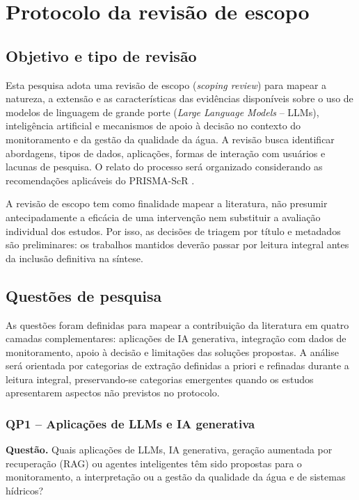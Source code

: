 \chapter{Protocolo da revisão de escopo}
\label{ap:protocolo}

\section{Objetivo e tipo de revisão}

Esta pesquisa adota uma revisão de escopo (\textit{scoping review}) para
mapear a natureza, a extensão e as características das evidências
disponíveis sobre o uso de modelos de linguagem de grande porte
(\textit{Large Language Models} -- LLMs), inteligência artificial e
mecanismos de apoio à decisão no contexto do monitoramento e da gestão
da qualidade da água. A revisão busca identificar abordagens, tipos de
dados, aplicações, formas de interação com usuários e lacunas de pesquisa.
O relato do processo será organizado considerando as recomendações
aplicáveis do PRISMA-ScR \cite{tricco2018prismascr}.

A revisão de escopo tem como finalidade mapear a literatura, não presumir
antecipadamente a eficácia de uma intervenção nem substituir a avaliação
individual dos estudos. Por isso, as decisões de triagem por título e
metadados são preliminares: os trabalhos mantidos deverão passar por
leitura integral antes da inclusão definitiva na síntese.

\section{Questões de pesquisa}

As questões foram definidas para mapear a contribuição da literatura em quatro
camadas complementares: aplicações de IA generativa, integração com dados de
monitoramento, apoio à decisão e limitações das soluções propostas. A análise
será orientada por categorias de extração definidas a priori e refinadas durante
a leitura integral, preservando-se categorias emergentes quando os estudos
apresentarem aspectos não previstos no protocolo.

\subsection{QP1 -- Aplicações de LLMs e IA generativa}

\textbf{Questão.} Quais aplicações de LLMs, IA generativa, geração aumentada
por recuperação (RAG) ou agentes inteligentes têm sido propostas para o
monitoramento, a interpretação ou a gestão da qualidade da água e de sistemas
hídricos?

